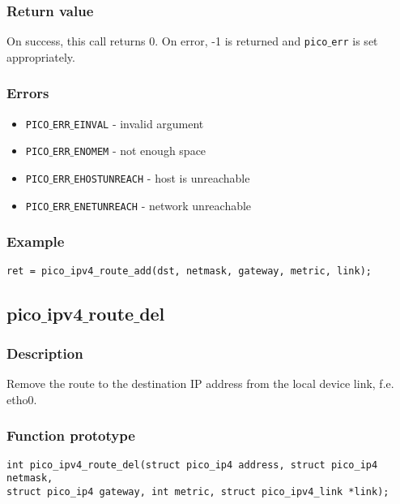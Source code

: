 \subsubsection*{Return value}
On success, this call returns 0. On error, -1 is returned and \texttt{pico$\_$err} is set appropriately. 

\subsubsection*{Errors}
\begin{itemize}[noitemsep]
\item \texttt{PICO$\_$ERR$\_$EINVAL} - invalid argument
\item \texttt{PICO$\_$ERR$\_$ENOMEM} - not enough space
\item \texttt{PICO$\_$ERR$\_$EHOSTUNREACH} - host is unreachable
\item \texttt{PICO$\_$ERR$\_$ENETUNREACH} - network unreachable
\end{itemize}

\subsubsection*{Example}
\begin{verbatim}
ret = pico_ipv4_route_add(dst, netmask, gateway, metric, link);
\end{verbatim}



\subsection{pico$\_$ipv4$\_$route$\_$del}

\subsubsection*{Description}
Remove the route to the destination IP address from the local device link, f.e. etho0.

\subsubsection*{Function prototype}
\begin{verbatim}
int pico_ipv4_route_del(struct pico_ip4 address, struct pico_ip4 netmask,
struct pico_ip4 gateway, int metric, struct pico_ipv4_link *link); 
\end{verbatim}

